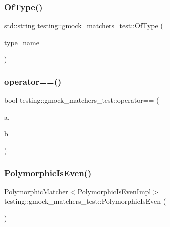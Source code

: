 \subsubsection{\texorpdfstring{OfType()}{OfType()}}
{\footnotesize\ttfamily std\+::string testing\+::gmock\+\_\+matchers\+\_\+test\+::\+Of\+Type (\begin{DoxyParamCaption}\item[{const std\+::string \&}]{type\+\_\+name }\end{DoxyParamCaption})}

\mbox{\label{namespacetesting_1_1gmock__matchers__test_a33c068c32bf5118e5be92771b146db77}} 
\subsubsection{\texorpdfstring{operator==()}{operator==()}}
{\footnotesize\ttfamily bool testing\+::gmock\+\_\+matchers\+\_\+test\+::operator== (\begin{DoxyParamCaption}\item[{const \mbox{\hyperlink{structtesting_1_1gmock__matchers__test_1_1IntReferenceWrapper}{Int\+Reference\+Wrapper}} \&}]{a,  }\item[{const \mbox{\hyperlink{structtesting_1_1gmock__matchers__test_1_1IntReferenceWrapper}{Int\+Reference\+Wrapper}} \&}]{b }\end{DoxyParamCaption})}

\mbox{\label{namespacetesting_1_1gmock__matchers__test_a8a0035a0de2d219d89ff7070762ece72}} 
\subsubsection{\texorpdfstring{PolymorphicIsEven()}{PolymorphicIsEven()}}
{\footnotesize\ttfamily Polymorphic\+Matcher$<$\mbox{\hyperlink{classtesting_1_1gmock__matchers__test_1_1PolymorphicIsEvenImpl}{Polymorphic\+Is\+Even\+Impl}}$>$ testing\+::gmock\+\_\+matchers\+\_\+test\+::\+Polymorphic\+Is\+Even (\begin{DoxyParamCaption}{ }\end{DoxyParamCaption})}

